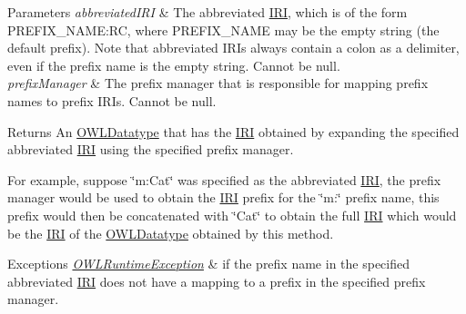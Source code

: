 \begin{DoxyParams}{Parameters}
{\em abbreviated\-I\-R\-I} & The abbreviated \hyperlink{classorg_1_1semanticweb_1_1owlapi_1_1model_1_1_i_r_i}{I\-R\-I}, which is of the form P\-R\-E\-F\-I\-X\-\_\-\-N\-A\-M\-E\-:R\-C, where P\-R\-E\-F\-I\-X\-\_\-\-N\-A\-M\-E may be the empty string (the default prefix). Note that abbreviated I\-R\-Is always contain a colon as a delimiter, even if the prefix name is the empty string. Cannot be null. \\
\hline
{\em prefix\-Manager} & The prefix manager that is responsible for mapping prefix names to prefix I\-R\-Is. Cannot be null. \\
\hline
\end{DoxyParams}
\begin{DoxyReturn}{Returns}
An \hyperlink{interfaceorg_1_1semanticweb_1_1owlapi_1_1model_1_1_o_w_l_datatype}{O\-W\-L\-Datatype} that has the \hyperlink{classorg_1_1semanticweb_1_1owlapi_1_1model_1_1_i_r_i}{I\-R\-I} obtained by expanding the specified abbreviated \hyperlink{classorg_1_1semanticweb_1_1owlapi_1_1model_1_1_i_r_i}{I\-R\-I} using the specified prefix manager. 
\end{DoxyReturn}
For example, suppose \char`\"{}m\-:\-Cat\char`\"{} was specified as the abbreviated \hyperlink{classorg_1_1semanticweb_1_1owlapi_1_1model_1_1_i_r_i}{I\-R\-I}, the prefix manager would be used to obtain the \hyperlink{classorg_1_1semanticweb_1_1owlapi_1_1model_1_1_i_r_i}{I\-R\-I} prefix for the \char`\"{}m\-:\char`\"{} prefix name, this prefix would then be concatenated with \char`\"{}\-Cat\char`\"{} to obtain the full \hyperlink{classorg_1_1semanticweb_1_1owlapi_1_1model_1_1_i_r_i}{I\-R\-I} which would be the \hyperlink{classorg_1_1semanticweb_1_1owlapi_1_1model_1_1_i_r_i}{I\-R\-I} of the \hyperlink{interfaceorg_1_1semanticweb_1_1owlapi_1_1model_1_1_o_w_l_datatype}{O\-W\-L\-Datatype} obtained by this method. 
\begin{DoxyExceptions}{Exceptions}
{\em \hyperlink{classorg_1_1semanticweb_1_1owlapi_1_1model_1_1_o_w_l_runtime_exception}{O\-W\-L\-Runtime\-Exception}} & if the prefix name in the specified abbreviated \hyperlink{classorg_1_1semanticweb_1_1owlapi_1_1model_1_1_i_r_i}{I\-R\-I} does not have a mapping to a prefix in the specified prefix manager. \\
\hline
\end{DoxyExceptions}
